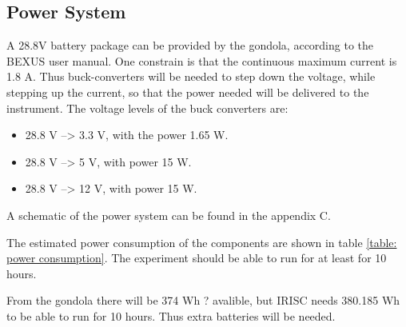\pagebreak
\subsection{Power System}
A 28.8V battery package can be provided by the gondola, according to the BEXUS user manual. One constrain is that the continuous maximum current is 1.8 A. Thus buck-converters will be needed to step down the voltage, while stepping up the current, so that the power needed will be delivered to the instrument. The voltage levels of the buck converters are: 

\begin{itemize}
	\item 28.8 V --> 3.3 V, with the power 1.65 W.
	\item 28.8 V --> 5 V, with power 15 W.
	\item 28.8 V --> 12 V, with power 15 W.
\end{itemize}

A schematic of the power system can be found in the appendix C.

The estimated power consumption of the components are shown in table \ref{table: power consumption}. The experiment should be able to run for at least for 10 hours. 


From the gondola there will be 374 Wh ? avalible, but IRISC needs 380.185 Wh to be able to run for 10 hours. Thus extra batteries will be needed. 




\raggedbottom
